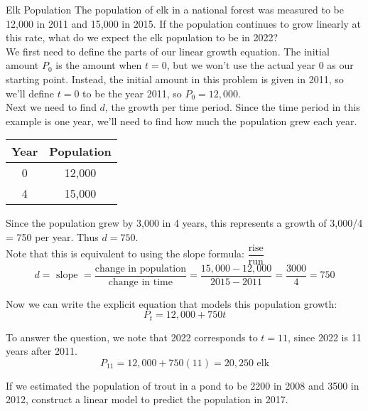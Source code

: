 \begin{example}[https://www.youtube.com/watch?v=cpaNK4jbMkA]{Elk Population}
The population of elk in a national forest was measured to be 12,000 in 2011 and 15,000 in 2015.  If the population continues to grow linearly at this rate, what do we expect the elk population to be in 2022?\\

We first need to define the parts of our linear growth equation.  The initial amount $P_0$ is the amount when $t=0$, but we won't use the actual year 0 as our starting point.  Instead, the initial amount in this problem is given in 2011, so we'll define $t=0$ to be the year 2011, so $P_0=12,000$.\\

Next we need to find $d$, the growth per time period.  Since the time period in this example is one year, we'll need to find how much the population grew each year.
\begin{center}
\begin{tabular}{c c}
\textbf{Year} & \textbf{Population}\\
\hline
0 & 12,000\\
4 & 15,000
\end{tabular}
\end{center}
Since the population grew by 3,000 in 4 years, this represents a growth of 3,000/4 = 750 per year.  Thus $d=750$.\\

Note that this is equivalent to using the slope formula: $\dfrac{\textrm{rise}}{\textrm{run}}$
\[d = \textrm{ slope } = \dfrac{\textrm{change in population}}{\textrm{change in time}} = \dfrac{15,000 - 12,000}{2015 - 2011} = \dfrac{3000}{4} = 750\]

Now we can write the explicit equation that models this population growth:
\[P_t = 12,000 + 750t\]

To answer the question, we note that 2022 corresponds to $t=11$, since 2022 is 11 years after 2011.
\[P_{11} = 12,000 + 750(11) = 20,250 \textrm{ elk}\]
\end{example}

\begin{try}
If we estimated the population of trout in a pond to be 2200 in 2008 and 3500 in 2012, construct a linear model to predict the population in 2017.
\end{try}
\vspace{0.5in}

